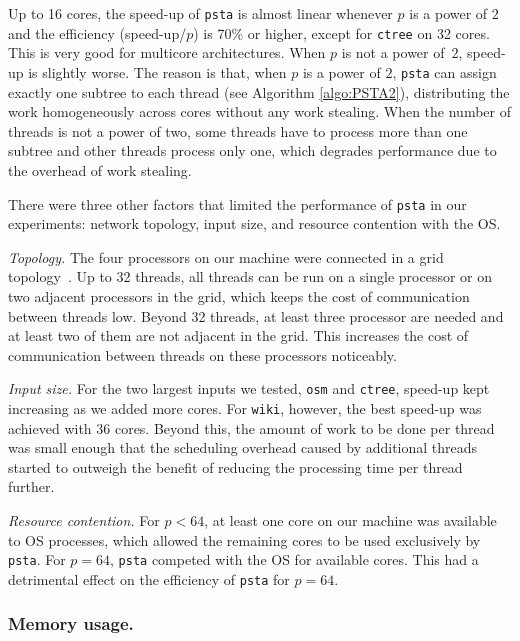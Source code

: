 Up to 16 cores, the speed-up of {\tt psta} is almost linear whenever $p$ is a
power of $2$ and the efficiency (speed-up/$p$) is 70\% or higher, except for
{\tt ctree} on 32 cores.
This is very good for multicore architectures.
When $p$ is not a power of~$2$, speed-up is slightly worse.
The reason is that, when $p$ is a power of $2$, {\tt psta} can assign exactly
one subtree to each thread (see Algorithm \ref{algo:PSTA2}), distributing the
work homogeneously across cores without any work stealing.
When the number of threads is not a power of two, some threads have to process
more than one subtree and other threads process only one, which degrades
performance due to the overhead of work stealing.

There were three other factors that limited the performance of {\tt psta} in
our experiments: network topology, input size, and resource contention with
the OS.

\textit{Topology.}
The four processors on our machine were connected in a grid
topology~\cite{Drepper2007}.
Up to 32 threads, all threads can be run on a single processor or on two
adjacent processors in the grid, which keeps the cost of communication between
threads low.
Beyond 32 threads, at least three processor are needed and
at least two of them are not adjacent in the grid.
This increases the cost of communication between threads on these processors
noticeably.

\textit{Input size.}
For the two largest inputs we tested, {\tt osm} and {\tt ctree}, speed-up
kept increasing as we added more cores.
For {\tt wiki}, however, the best speed-up was achieved with 36 cores.
Beyond this, the amount of work to be done per thread was small enough that
the scheduling overhead caused by additional threads started to outweigh the
benefit of reducing the processing time per thread further.

\textit{Resource contention.}
For $p < 64$, at least one core on our machine was available to OS processes,
which allowed the remaining cores to be used exclusively by {\tt psta}.
For $p = 64$, {\tt psta} competed with the OS for available cores.
This had a detrimental effect on the efficiency of {\tt psta} for $p = 64$.

\subsubsection{Memory usage.}

